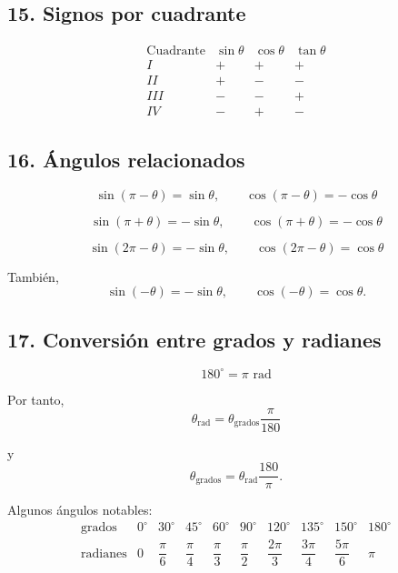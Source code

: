 \documentclass[12pt]{article}
\begin{document}
\subsection*{15. Signos por cuadrante}

\[
\begin{array}{c|ccc}
\text{Cuadrante}
&
\sin\theta
&
\cos\theta
&
\tan\theta
\\ \hline
I   & + & + & +\\
II  & + & - & -\\
III & - & - & +\\
IV  & - & + & -
\end{array}
\]

\subsection*{16. Ángulos relacionados}

\[
\boxed{
\sin(\pi-\theta)=\sin\theta,
\qquad
\cos(\pi-\theta)=-\cos\theta
}
\]

\[
\boxed{
\sin(\pi+\theta)=-\sin\theta,
\qquad
\cos(\pi+\theta)=-\cos\theta
}
\]

\[
\boxed{
\sin(2\pi-\theta)=-\sin\theta,
\qquad
\cos(2\pi-\theta)=\cos\theta
}
\]

También,
\[
\boxed{
\sin(-\theta)=-\sin\theta,
\qquad
\cos(-\theta)=\cos\theta.
}
\]

\subsection*{17. Conversión entre grados y radianes}

\[
\boxed{
180^\circ=\pi\text{ rad}
}
\]

Por tanto,
\[
\boxed{
\theta_{\mathrm{rad}}
=
\theta_{\mathrm{grados}}\frac{\pi}{180}
}
\]

y
\[
\boxed{
\theta_{\mathrm{grados}}
=
\theta_{\mathrm{rad}}\frac{180}{\pi}.
}
\]

Algunos ángulos notables:
\[
\begin{array}{c|ccccccccc}
\text{grados}
&0^\circ&30^\circ&45^\circ&60^\circ&90^\circ&
120^\circ&135^\circ&150^\circ&180^\circ
\\ \hline
\text{radianes}
&0&
\dfrac{\pi}{6}&
\dfrac{\pi}{4}&
\dfrac{\pi}{3}&
\dfrac{\pi}{2}&
\dfrac{2\pi}{3}&
\dfrac{3\pi}{4}&
\dfrac{5\pi}{6}&
\pi
\end{array}
\]
\end{document}
